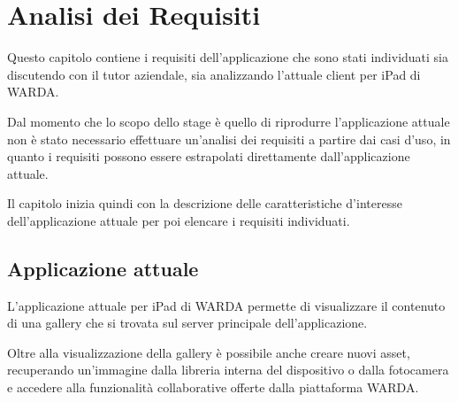 
\chapter{Analisi dei Requisiti}
\label{cap:analisi-dei-requisiti}

Questo capitolo contiene i requisiti dell'applicazione che sono stati individuati sia discutendo con il tutor aziendale, sia analizzando l'attuale client per iPad di WARDA.

Dal momento che lo scopo dello stage è quello di riprodurre l'applicazione attuale non è stato necessario effettuare un'analisi dei requisiti a partire dai casi d'uso, in quanto i requisiti possono essere estrapolati direttamente dall'applicazione attuale.

Il capitolo inizia quindi con la descrizione delle caratteristiche d'interesse dell'applicazione attuale per poi elencare i requisiti individuati.





\section{Applicazione attuale}

L'applicazione attuale per iPad di WARDA permette di visualizzare il contenuto di una gallery che si trovata sul server principale dell'applicazione.

Oltre alla visualizzazione della gallery è possibile anche creare nuovi asset, recuperando un'immagine dalla libreria interna del dispositivo o dalla fotocamera e accedere alla funzionalità collaborative offerte dalla piattaforma WARDA.


